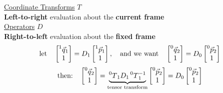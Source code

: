 \documentclass[twocolumn, 12pt]{article}    %
\begin{document}
\RaggedRight
\footnotesize %

\noindent
\underline{Coordinate Transforms} \(T\)\\
\textbf{Left-to-right} evaluation about the \textbf{current frame}\\

\noindent
\underline{Operators} \(D\)\\
\textbf{Right-to-left} evaluation about the \textbf{fixed frame}\\

\begin{equation*} 
    \text{let} \hspace{10pt}
    \begin{bmatrix}
        \prescript{1}{}{\Vec{q}}_1 \\ 1
    \end{bmatrix} = D_1 \begin{bmatrix}
        \prescript{1}{}{\Vec{p}}_1 \\1
    \end{bmatrix}, \hspace{10pt} \text{and we want} \hspace{10pt}\begin{bmatrix}
        \prescript{0}{}{\Vec{q}}_2 \\ 1
    \end{bmatrix} = D_0 \begin{bmatrix}
        \prescript{0}{}{\Vec{p}}_2 \\ 1
    \end{bmatrix} 
\end{equation*}
\begin{equation*}
    \text{then:}\hspace{10pt}
     \begin{bmatrix}
        \prescript{0}{}{\Vec{q}}_2 \\ 1
    \end{bmatrix} = \underbrace{\prescript{0}{}{T}_1 D_1 \prescript{0}{}{T}_1^{-1}}_{\text{tensor transform}} \begin{bmatrix}
        \prescript{0}{}{\Vec{p}}_2 \\ 1
    \end{bmatrix} = D_0\begin{bmatrix}
        \prescript{0}{}{\Vec{p}}_2 \\ 1
    \end{bmatrix} 
\end{equation*}
\end{document}
